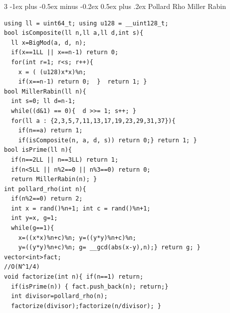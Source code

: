 \documentclass[8pt,a4paper,onesided]{article}
\makeatletter
\renewcommand{\subsection}{\@startsection{subsection}{2}{0mm}
    {-1ex plus -0.5ex minus -0.2ex} %
    {0.5ex plus .2ex}                %
    {\normalfont\large\bfseries}}    %
\makeatother
\begin{document}
\begin{multicols}{3}
\subsection{Pollard Rho Miller Rabin}
\begin{verbatim}
using ll = uint64_t; using u128 = __uint128_t;
bool isComposite(ll n,ll a,ll d,int s){
  ll x=BigMod(a, d, n);
  if(x==1LL || x==n-1) return 0;
  for(int r=1; r<s; r++){
    x = ( (u128)x*x)%n;
    if(x==n-1) return 0;  }  return 1; }
bool MillerRabin(ll n){
  int s=0; ll d=n-1;
  while((d&1) == 0){  d >>= 1; s++; }
  for(ll a : {2,3,5,7,11,13,17,19,23,29,31,37}){
    if(n==a) return 1;
    if(isComposite(n, a, d, s)) return 0;} return 1; }
bool isPrime(ll n){
  if(n==2LL || n==3LL) return 1;
  if(n<5LL || n%2==0 || n%3==0) return 0;
  return MillerRabin(n); }
int pollard_rho(int n){
  if(n%2==0) return 2;
  int x = rand()%n+1; int c = rand()%n+1;
  int y=x, g=1;
  while(g==1){
    x=((x*x)%n+c)%n; y=((y*y)%n+c)%n;
    y=((y*y)%n+c)%n; g= __gcd(abs(x-y),n);} return g; }
vector<int>fact;
//O(N^1/4)
void factorize(int n){ if(n==1) return;
  if(isPrime(n)) { fact.push_back(n); return;}
  int divisor=pollard_rho(n);
  factorize(divisor);factorize(n/divisor); }
\end{verbatim}

\end{multicols}
\end{document}
